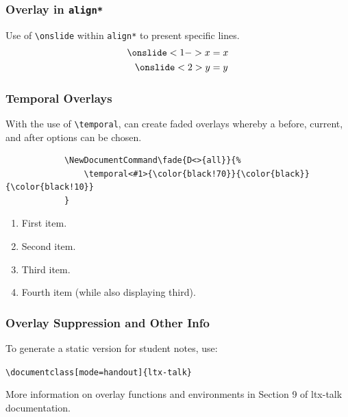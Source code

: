 \documentclass{ltx-talk}
\begin{document}
	
	\begin{frame}
		\frametitle{Overlay in \texttt{align*}}
		Use of \texttt{\textbackslash onslide} within \texttt{align*} to present specific lines.
		\begin{align*}
			\onslide<1-> x &= x\\
			\onslide<2> y &= y
		\end{align*}
	\end{frame}
	
	\begin{frame*}
		\frametitle{Temporal Overlays}
		 With the use of \texttt{\textbackslash temporal}, can create faded overlays whereby a before, current, and after options can be chosen.
		\begin{verbatim}
			\NewDocumentCommand\fade{D<>{all}}{%
				\temporal<#1>{\color{black!70}}{\color{black}}{\color{black!10}}
			}
		\end{verbatim}
		\vspace{-0.5cm}
		
		\begin{enumerate}
			 \item First item.
			\fade<3> \item Second item.
			\fade<4-5>\item Third item.
			\fade<6>\item Fourth item (while also displaying third).
		\end{enumerate}
		\vspace{1cm}
		
		
	\end{frame*}
	
	
	\begin{frame}
		\frametitle{Overlay Suppression and Other Info}
		To generate a static version for student notes, use:
		\vspace{0.3cm}
		\begin{center}
			\large \texttt{\textbackslash documentclass[mode=handout]\{ltx-talk\}}
		\end{center}
		\vspace{0.3cm}
		
		More information on overlay functions and environments in Section 9 of ltx-talk documentation.
	\end{frame}
	
\end{document}
